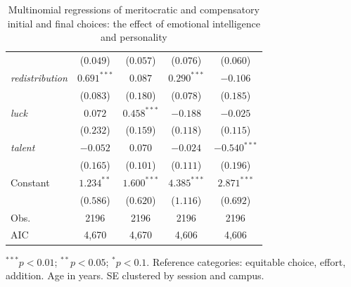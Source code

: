 \begin{table}[htpb]
\begin{threeparttable}
\begin{tabular}{l cc cc}
           & ($0.049$) & ($0.057$) & ($0.076$) & ($0.060$) \\
\textit{redistribution} & $0.691^{***}$ & $0.087$ & $0.290^{***}$ & $-0.106$ \\
           & ($0.083$) & ($0.180$) & ($0.078$) & ($0.185$) \\
\textit{luck} & $0.072$ & $0.458^{***}$ & $-0.188$ & $-0.025$ \\
           & ($0.232$) & ($0.159$) & ($0.118$) & ($0.115$) \\
\textit{talent} & $-0.052$ & $0.070$ & $-0.024$ & $-0.540^{***}$ \\
           & ($0.165$) & ($0.101$) & ($0.111$) & ($0.196$) \\
Constant & $1.234^{**}$ & $1.600^{***}$ & $4.385^{***}$ & $2.871^{***}$ \\
           & ($0.586$) & ($0.620$) & ($1.116$) & ($0.692$) \\
\midrule
Obs. & 2196 & 2196 & 2196 & 2196 \\
AIC  & 4,670 & 4,670 & 4,606 & 4,606 \\
\bottomrule
\end{tabular}
\begin{tablenotes}[flushleft]\footnotesize
\item $^{***}p<0.01$; $^{**}p<0.05$; $^{*}p<0.1$. Reference categories: equitable choice, effort, addition. Age in years. SE clustered by session and campus.
\end{tablenotes}
\end{threeparttable}
\caption{Multinomial regressions of meritocratic and compensatory initial and final choices: the effect of emotional intelligence and personality}
\label{table-ToMandBig5}
\end{table}
